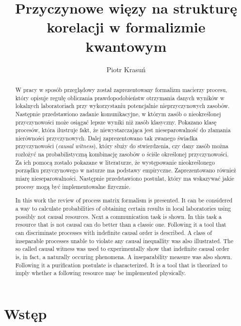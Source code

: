\documentclass[10pt]{article} %
\title{Przyczynowe więzy na strukturę korelacji w formalizmie kwantowym}
\author{Piotr Krasuń}
\begin{document}
\maketitle

\newpage
\begin{abstract}
W pracy w sposób przeglądowy został zaprezentowany formalizm macierzy procesu, który opisuje regułę obliczania prawdopodobieństw otrzymania danych wyników w lokalnych laboratoriach przy wykorzystaniu potencjalnie nieprzyczynowych zasobów. Następnie przedstawiono zadanie komunikacyjne, w którym zasób o nieokreślonej przyczynowości może osiągać lepsze wyniki niż zasób klasyczny. Pokazano klasę procesów, która ilustruje fakt, że niewystarczająca jest nieseparowalność do złamania nierówności przyczynowych. Dalej zaprezentowano tak zwanego świadka przyczynowości (\textit{causal witness}), który służy do stwierdzenia, czy dany zasób można rozłożyć na probabilistyczną kombinację zasobów o ściśle określonej przyczynowości. Za ich pomocą zostało pokazane w literaturze, że występowanie nieokreślonego porządku przyczynowego w naturze ma podstawy empiryczne. Zaprezentowano również miarę nieseparowalności. Następnie przedstawiono postulat, który ma wskazywać jakie procesy mogą być implementowalne fizycznie.
\end{abstract}
\renewcommand{\abstractname}{Abstract}
\begin{abstract}
In this work the review of process matrix formalism is presented. It can be considered a way to calculate probabilities of obtaining certain results in local laboratories using possibly not causal resources. Next a communication task is shown. In this task a resource that is not causal can do better than a classic one. Following it a tool that can discriminate processes with indefinite causal order is described. A class of inseparable processes unable to violate any causal inequallity was also illustrated. The so called causal witness was used to experimentally show that indefinite causal order is, in fact, a naturally occuring phenomena. A inseparability measure was also shown. Following it a purification postulate is characterized. It is a tool that is theorized to imply whether a following resource may be implemented physically.
\end{abstract}
\section{Wstęp}
\end{document}
